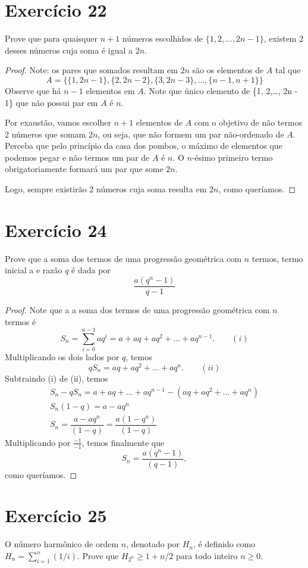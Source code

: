 \documentclass{article}
\newcommand{\set}[1]{\{#1\}}
\begin{document}
\section*{Exercício 22}
Prove que para quaisquer $n + 1$ números escolhidos de $\{1, 2,\dots, 2n - 1\}$, existem 2 desses números cuja soma é igual a $2n$.

\begin{proof}
Note: os pares que somados resultam em $2n$ são os elementos de $A$ tal que
\[ A = \set{ \set{1,2n-1}, \set{2,2n-2}, \set{3,2n-3}, \dots, \set{n-1,n+1} }\]
Observe que há $n-1$ elementos em $A$. Note que único elemento de \set{1, 2,\dots, 2n - 1} que não possui par em $A$ é $n$.

Por exaustão, vamos escolher $n+1$ elementos de $A$ com o objetivo de não termos 2 números que somam $2n$, ou seja, que não formem um par não-ordenado de $A$.
Perceba que pelo princípio da casa dos pombos, o máximo de elementos que podemos pegar e não termos um par de $A$ é $n$.
O $n$-ésimo primeiro termo obrigatoriamente formará um par que some $2n$.

Logo, sempre existirão 2 números cuja soma resulta em $2n$, como queríamos.
\end{proof}


\section*{Exercício 24}
Prove que a soma dos termos de uma progressão geométrica com $n$ termos, termo inicial a e razão $q$ é dada por
\[ \dfrac{a(q^n - 1)}{q - 1} \]
\begin{proof}
Note que a a soma dos termos de uma progressão geométrica com $n$ termos é
\[ S_n = \sum_{i=0}^{n-1} a q^i = a + aq + aq^2 + \dots + aq^{n-1} . \qquad (i)\]
Multiplicando os dois lados por $q$, temos
\[ q S_n = aq + aq^2 + \dots + aq^n . \qquad (ii)\]
Subtraindo (i) de (ii), temos 
\begin{gather*}
S_n - q S_n  = a + aq + \dots + aq^{n-1} - (aq + aq^2 + \dots + aq^n) \\
S_n (1 - q) = a - aq^n \\
S_n  = \dfrac{a - aq^n}{(1 - q)} = \dfrac{a(1 - q^n)}{(1 - q)}
\end{gather*}
Multiplicando por $\frac{-1}{-1}$, temos finalmente que
\[ S_n = \dfrac{a(q^n - 1)}{(q-1)}, \]
como queríamos.
\end{proof}

\section*{Exercício 25}
O número harmônico de ordem $n$, denotado por $H_n$, é definido como $H_n = \sum_{i=1}^{n}(1/i)$.
Prove que $H_{2^n} \geq 1 + n/2$ para todo inteiro $n \geq 0$.
\end{document}
